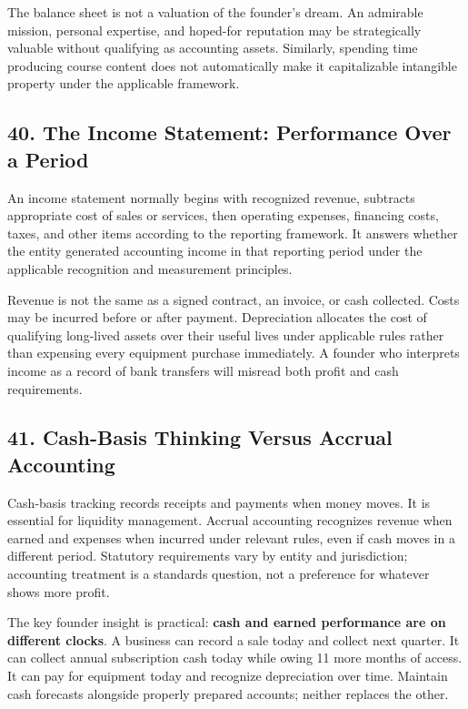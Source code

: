 The balance sheet is not a valuation of the founder's dream. An admirable mission, personal expertise, and hoped-for reputation may be strategically valuable without qualifying as accounting assets. Similarly, spending time producing course content does not automatically make it capitalizable intangible property under the applicable framework.

\subsection*{40. The Income Statement: Performance Over a Period}

An income statement normally begins with recognized revenue, subtracts appropriate cost of sales or services, then operating expenses, financing costs, taxes, and other items according to the reporting framework. It answers whether the entity generated accounting income in that reporting period under the applicable recognition and measurement principles.

Revenue is not the same as a signed contract, an invoice, or cash collected. Costs may be incurred before or after payment. Depreciation allocates the cost of qualifying long-lived assets over their useful lives under applicable rules rather than expensing every equipment purchase immediately. A founder who interprets income as a record of bank transfers will misread both profit and cash requirements.

\subsection*{41. Cash-Basis Thinking Versus Accrual Accounting}

Cash-basis tracking records receipts and payments when money moves. It is essential for liquidity management. Accrual accounting recognizes revenue when earned and expenses when incurred under relevant rules, even if cash moves in a different period. Statutory requirements vary by entity and jurisdiction; accounting treatment is a standards question, not a preference for whatever shows more profit.

The key founder insight is practical: \textbf{cash and earned performance are on different clocks}. A business can record a sale today and collect next quarter. It can collect annual subscription cash today while owing 11 more months of access. It can pay for equipment today and recognize depreciation over time. Maintain cash forecasts alongside properly prepared accounts; neither replaces the other.

